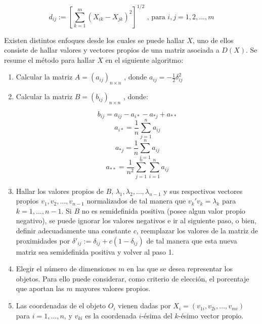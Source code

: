 \documentclass[12pt,oneside]{book}\usepackage[]{graphicx}\usepackage[]{color}
\theoremstyle{definition} %
\begin{document}
$$ d_{ij}:=\left[\displaystyle \sum_{k=1}^m (X_{ik}-X_{jk})^2 \right]^{1/2} \text{ , para } i,j=1,2,...,m$$


Existen distintos enfoques desde los cuales se puede hallar $X$, uno de ellos consiste de hallar valores y vectores propios de una matriz asociada a $D(X)$. Se resume el método para hallar $X$ en el siguiente algoritmo:

\begin{enumerate}

\item Calcular la matriz $A=(a_{ij})_{n\times n}$ , donde $a_{ij} = -\frac{1}{2}\delta_{ij}^2$
\item Calcular la matriz $B = (b_{ij})_{n\times n}$ , donde: 

$$b_{ij} = a_{ij} -a_{i*}-a_{*j} + a_{**} $$
$$a_{i*} = \frac{1}{n} \sum_{j=1}^n a_{ij}  $$
$$a_{*j} = \frac{1}{n} \sum_{i=1}^n a_{ij}  $$
$$a_{**} = \frac{1}{n^2} \sum_{j=1}^n  \sum_{i=1}^n  a_{ij}  $$

\item Hallar los valores propios de $B$, $\lambda_1, \lambda_2, \dots , \lambda_{n-1}$ y sus respectivos vectores propios $v_1, v_2, \dots, v_{n-1}$ normalizados de tal manera que $v_k' v_k = \lambda_k$ para $k=1,\dots,n-1$. Si $B$ no es semidefinida positiva (posee algun valor propio negativo), se puede ignorar los valores negativos e ir al siguiente paso, o bien, definir adecuadamente una constante $c$, reemplazar los valores de la matriz de proximidades por $\delta'_{ij} := \delta_{ij} + c(1-\delta_{ij}) $ de tal manera que esta nueva matriz sea semidefinida positiva y volver al paso 1.

\item Elegir el número de dimensiones $m$ en las que se desea representar los objetos. Para ello puede considerar, como criterio de elección, el porcentaje que aportan las $m$ mayores valores propios.

\item Las coordenadas de el objeto $O_i$ vienen dadas por $X_i = (v_{1i}, v_{2i},\dots, v_{mi})$ para $i=1,\dots,n$, y $v_{ki}$ es la coordenada $i$-ésima del $k$-ésimo vector propio.

\end{enumerate}
\end{document}
